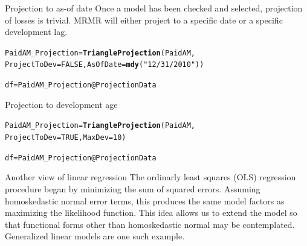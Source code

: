 \documentclass[xcolor=dvipsnames]{beamer}\usepackage{graphicx, color}
\makeatletter
\newcommand{\hlfunctioncall}[1]{\textcolor[rgb]{0.501960784313725,0,0.329411764705882}{\textbf{#1}}}%
\newcommand{\hlstring}[1]{\textcolor[rgb]{0.6,0.6,1}{#1}}%
\newenvironment{kframe}{%
 \def\at@end@of@kframe{}%
 \ifinner\ifhmode%
  \def\at@end@of@kframe{\end{minipage}}%
  \begin{minipage}{\columnwidth}%
 \fi\fi%
 \def\FrameCommand##1{\hskip\@totalleftmargin \hskip-\fboxsep
 \colorbox{shadecolor}{##1}\hskip-\fboxsep
     \hskip-\linewidth \hskip-\@totalleftmargin \hskip\columnwidth}%
 \MakeFramed {\advance\hsize-\width
   \@totalleftmargin\z@ \linewidth\hsize
   \@setminipage}}%
 {\par\unskip\endMakeFramed%
 \at@end@of@kframe}
\newenvironment{knitrout}{}{} %
\makeatother
\begin{document}
\begin{frame}[fragile]{Projection to as-of date}
Once a model has been checked and selected, projection of losses is trivial. MRMR will either project to a specific date or a specific development lag.
\begin{knitrout}
\color{fgcolor}\begin{kframe}
\begin{alltt}
PaidAM_Projection = \hlfunctioncall{TriangleProjection}(PaidAM, 
    ProjectToDev = FALSE, AsOfDate = \hlfunctioncall{mdy}(\hlstring{"12/31/2010"}))
\end{alltt}


{\ttfamily\noindent\itshape\color{messagecolor}{\#\# estimate only: convert to intervals for accuracy}}\begin{alltt}
df = PaidAM_Projection@ProjectionData
\end{alltt}
\end{kframe}
\end{knitrout}

\end{frame}

\begin{frame}[fragile]{Projection to development age}
\begin{knitrout}
\color{fgcolor}\begin{kframe}
\begin{alltt}
PaidAM_Projection = \hlfunctioncall{TriangleProjection}(PaidAM, 
    ProjectToDev = TRUE, MaxDev = 10)
\end{alltt}


{\ttfamily\noindent\itshape\color{messagecolor}{\#\# estimate only: convert to intervals for accuracy}}\begin{alltt}
df = PaidAM_Projection@ProjectionData
\end{alltt}
\end{kframe}
\end{knitrout}

\end{frame}

\begin{frame}[fragile]{Another view of linear regression}
The ordinarly least squares (OLS) regression procedure began by minimizing the sum of squared errors. Assuming homoskedastic normal error terms, this produces the same model factors as maximizing the likelihood function.
\newline
\newline
This idea allows us to extend the model so that functional forms other than homoskedastic normal may be contemplated. Generalized linear models are one such example.
\end{frame}
\end{document}
